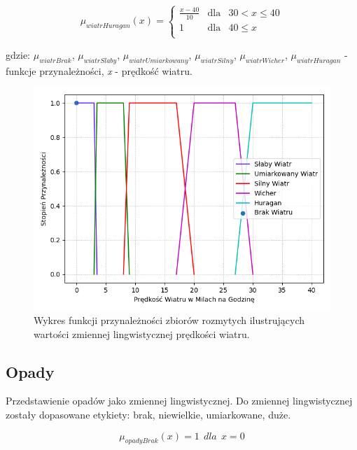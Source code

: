 \documentclass{classrep}
\begin{document}
\begin{equation}
\mu _{wiatrHuragan}(x) =  \left\{ \begin{array}{rcl}
\frac{x - 40}{10} & \mbox{dla} & 30 < x \leq 40\\
1 & \mbox{dla} & 40 \leq x\\
\end{array}\right.
\end{equation}

gdzie: \(\mu _{wiatrBrak}\), \(\mu _{wiatrSlaby}\), \(\mu _{wiatrUmiarkowany}\), \(\mu _{wiatrSilny}\), \(\mu _{wiatrWicher}\), \(\mu _{wiatrHuragan}\)  - funkcje przynależności, \textit{x} - prędkość wiatru. 

\begin{figure}[h!]
 \centering
 \includegraphics[width=14cm]{FunkcjaPrzynaleznosciPredkoscWiatru.png}
 \vspace{-0.3cm}
 \caption{Wykres funkcji przynależności zbiorów rozmytych ilustrujących wartości zmiennej lingwistycznej prędkości wiatru. }
 \label{rysunek do eksperymentu 1 wariantu 1}
\end{figure}
\newpage



\subsection{Opady}
Przedstawienie opadów jako zmiennej lingwistycznej. Do zmiennej lingwistycznej zostały dopasowane etykiety: brak, niewielkie, umiarkowane, duże. 

\begin{equation}
\mu _{opadyBrak}(x) =   1 \ \ dla \ \ x  = 0
\end{equation}
\end{document}
